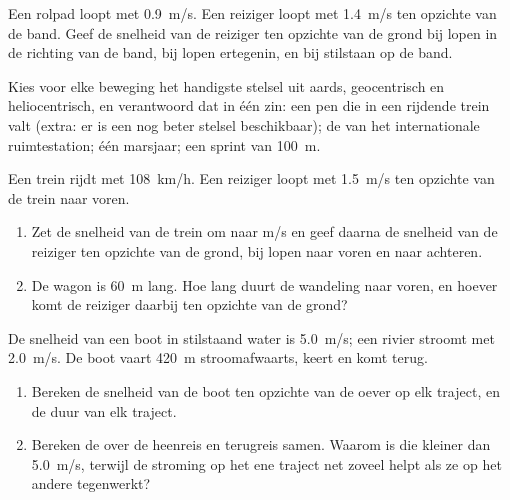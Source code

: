 \begin{exercise}[$\star$]\label{exo:g10:relative-motion:4}
Een rolpad loopt met \qty{0.9}{m/s}. Een reiziger loopt met
\qty{1.4}{m/s} ten opzichte van de band. Geef de snelheid van de reiziger
ten opzichte van de grond bij lopen in de richting van de band, bij lopen
ertegenin, en bij stilstaan op de band.
\end{exercise}

\begin{exercise}[$\star$]\label{exo:g10:relative-motion:5}
Kies voor elke beweging het handigste stelsel uit aards, geocentrisch en
heliocentrisch, en verantwoord dat in één zin: een pen die in een
rijdende trein valt (extra: er is een nog beter stelsel beschikbaar); de
 van het internationale ruimtestation; één marsjaar; een sprint
van \qty{100}{m}.
\end{exercise}

\begin{exercise}[$\star\star$]\label{exo:g10:relative-motion:6}
Een trein rijdt met \qty{108}{km/h}. Een reiziger loopt met
\qty{1.5}{m/s} ten opzichte van de trein naar voren.
\begin{enumerate}
  \item Zet de snelheid van de trein om naar \unit{m/s} en geef daarna de
        snelheid van de reiziger ten opzichte van de grond, bij lopen
        naar voren en naar achteren.
  \item De wagon is \qty{60}{m} lang. Hoe lang duurt de wandeling naar
        voren, en hoever komt de reiziger daarbij ten opzichte van de
        grond?
\end{enumerate}
\end{exercise}

\begin{exercise}[$\star\star$]\label{exo:g10:relative-motion:7}
De snelheid van een boot in stilstaand water is \qty{5.0}{m/s}; een
rivier stroomt met \qty{2.0}{m/s}. De boot vaart \qty{420}{m}
stroomafwaarts, keert en komt terug.
\begin{enumerate}
  \item Bereken de snelheid van de boot ten opzichte van de oever op elk
        traject, en de duur van elk traject.
  \item Bereken de  over de heenreis en terugreis
        samen. Waarom is die kleiner dan \qty{5.0}{m/s}, terwijl de
        stroming op het ene traject net zoveel helpt als ze op het
        andere tegenwerkt?
\end{enumerate}
\end{exercise}

